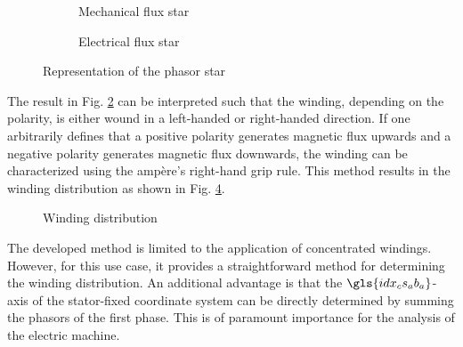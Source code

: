 %
\begin{figure}[ht]
    \centering
    \begin{subfigure}{.49\linewidth}
        \centering
    
        \caption{Mechanical flux star}
        \label{fig:Zahnstern_Mechanisch}
    \end{subfigure}
    \hfill
    \begin{subfigure}{.49\linewidth}
        \centering
    
        \caption{Electrical flux star}
        \label{fig:Zahnstern_Elektrisch}
    \end{subfigure}
    \caption{Representation of the phasor star}
    \label{fig:Zahnstern}
\end{figure}
%
The result in Fig. \ref{fig:Zahnstern_Elektrisch} can be interpreted such that the winding, depending on the polarity, is either wound in a left-handed or right-handed direction. If one arbitrarily defines that a positive polarity generates magnetic flux upwards and a negative polarity generates magnetic flux downwards, the winding can be characterized using the ampère's right-hand grip rule. This method results in the winding distribution as shown in Fig. \ref{fig:Wicklungsverteilung}.
%
\begin{figure}[ht]
    \centering
    
    \caption{Winding distribution}
    \label{fig:Wicklungsverteilung}
\end{figure}
%
The developed method is limited to the application of concentrated windings. However, for this use case, it provides a straightforward method for determining the winding distribution. An additional advantage is that the \(\gls{idx_cs_ab_a}\)-axis of the stator-fixed coordinate system can be directly determined by summing the phasors of the first phase. This is of paramount importance for the analysis of the electric machine.
